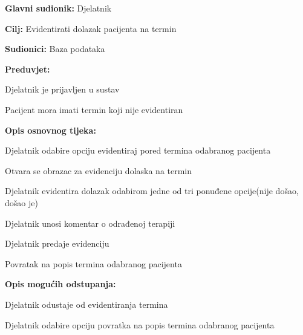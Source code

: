 				\begin{packed_item}
					
					\item \textbf{Glavni sudionik: }Djelatnik
					\item  \textbf{Cilj: }Evidentirati dolazak pacijenta na termin 
					\item  \textbf{Sudionici: }Baza podataka
					\item  \textbf{Preduvjet: }
					\item[] \begin{packed_enum}
						
						\item[-] Djelatnik je prijavljen u sustav
						\item[-] Pacijent mora imati termin koji nije evidentiran
					\end{packed_enum}
					\item  \textbf{Opis osnovnog tijeka: }
					
					\item[] \begin{packed_enum}
						\item Djelatnik odabire opciju evidentiraj pored termina odabranog pacijenta
						\item Otvara se obrazac za evidenciju dolaska na termin
						\item Djelatnik evidentira dolazak odabirom jedne od tri ponuđene opcije(nije došao, došao je)
						\item Djelatnik unosi komentar o odrađenoj terapiji
						\item Djelatnik predaje evidenciju
						\item Povratak na popis termina odabranog pacijenta
					\end{packed_enum}
					
					\item  \textbf{Opis mogućih odstupanja:}
					
					\item[] \begin{packed_item}
						
						\item[3.a] Djelatnik odustaje od evidentiranja termina
						\item[] \begin{packed_enum}
							\item Djelatnik odabire opciju povratka na popis termina odabranog pacijenta
							
						\end{packed_enum}
					\end{packed_item}
				\end{packed_item}
				

